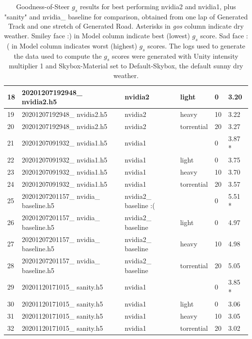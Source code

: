 \begin{table}[]
\begin{center}
\begin{tabular}{|l|l|l|l|l|l|}
18 & 20201207192948\_ nvidia2.h5 & nvidia2 & light & 0 & 3.20 \\ \hline
19 & 20201207192948\_ nvidia2.h5 & nvidia2 & heavy & 10 & 3.22 \\ \hline
20 & 20201207192948\_ nvidia2.h5 & nvidia2 & torrential & 20 & 3.27 \\ \hline
21 & 20201207091932\_ nvidia1.h5 & nvidia1 &  & 0 & 3.87 * \\ \hline
22 & 20201207091932\_ nvidia1.h5 & nvidia1 & light & 0 & 3.75 \\ \hline
23 & 20201207091932\_ nvidia1.h5 & nvidia1 & heavy & 10 & 3.70 \\ \hline
24 & 20201207091932\_ nvidia1.h5 & nvidia1 & torrential & 20 & 3.57 \\ \hline
25 & 20201207201157\_ nvidia\_ baseline.h5 & nvidia2\_ baseline :( &  & 0 & 5.51 * \\ \hline
26 & 20201207201157\_ nvidia\_ baseline.h5 & nvidia2\_ baseline & light & 0 & 4.97 \\ \hline
27 & 20201207201157\_ nvidia\_ baseline.h5 & nvidia2\_ baseline & heavy & 10 & 4.98 \\ \hline
28 & 20201207201157\_ nvidia\_ baseline.h5 & nvidia2\_ baseline & torrential & 20 & 5.05 \\ \hline
29 & 20201120171015\_ sanity.h5 & nvidia1 &  & 0 & 3.85 * \\ \hline
30 & 20201120171015\_ sanity.h5 & nvidia1 & light & 0 & 3.06 \\ \hline
31 & 20201120171015\_ sanity.h5 & nvidia1 & heavy & 10 & 3.05 \\ \hline
32 & 20201120171015\_ sanity.h5 & nvidia1 & torrential & 20 & 3.02 \\ \hline
\end{tabular}
\end{center}
\caption{Goodness-of-Steer $g_s$ results for best performing nvidia2 and nvidia1, plus "sanity" and nvidia\_ baseline for comparison, obtained from one lap of Generated Track and one stretch of Generated Road. Asterisks in \textit{gos} column indicate dry weather. Smiley face :) in Model column indicate best (lowest) $g_s$ score. Sad face :( in Model column indicates worst (highest) $g_s$ scores. The logs used to generate the data used to compute the $g_s$ scores were generated with Unity intensity multiplier 1 and Skybox-Material set to Default-Skybox, the default sunny dry weather.}
\label{table:goodness-of-steer}
\end{table}

